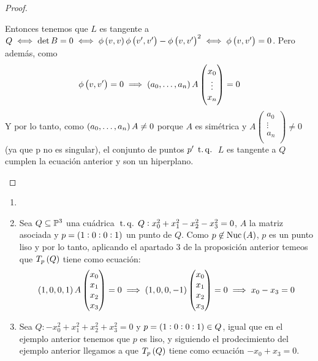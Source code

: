 \begin{proof}
\begin{enumerate}[(1)]
\[      \]
      Entonces tenemos que $L$ es tangente a $Q \iff \det B =0 \iff \phi\left( v,v\right)\phi\left( v',v'\right)
      - \phi\left( v,v'\right)^2 \iff \phi \left( v,v'\right) =0$. Pero además, como
      \[
        \phi\left( v,v'\right) =0\implies \left( a_0, \dots ,a_n \right) A 
        \begin{pmatrix}
          x_0\\ \vdots\\ x_n\\
        \end{pmatrix}=0
      \]
      Y por lo tanto, como $\left( a_0,\dots,a_n\right) A \neq 0$ porque $A$ es simétrica y $A\begin{pmatrix}
        a_0\\ \vdots\\ a_n\\ \end{pmatrix} \neq 0$ (ya que p no es singular), el conjunto de puntos $p' \operatorname{\;t.q.\;}$
      $L$ es tangente a $Q$ cumplen la ecuación anterior y son un hiperplano.
  \end{enumerate}
\end{proof}

\begin{example}
  \begin{enumerate}
    \item []
    \item Sea $Q\subseteq\mathbb{P}^3$ una cuádrica $\operatorname{\;t.q.\;} Q:x^2_0 +x^2_1 -x^2_2 -x^2_3=0$, $A$ la matriz asociada y $p=\left( 1:0:0:1\right)$
      un punto de $Q$. Como $p\not\in \operatorname{Nuc} \left( A\right)$, $p$ es un punto liso y por lo tanto, aplicando el 
      apartado $3$ de la proposición anterior temeos que $T_p\left( Q \right)$ tiene como ecuación:
      \[
        \left( 1,0,0,1 \right) A \begin{pmatrix}x_0\\x_1\\x_2\\x_3\\ \end{pmatrix} = 0 \implies 
        \left( 1,0,0,-1 \right) \begin{pmatrix}x_0\\x_1\\x_2\\x_3\\ \end{pmatrix} = 0 \implies
        x_0-x_3=0
      \]
    \item Sea $Q:-x^2_0 +x^2_1 +x^2_2 +x^2_3=0$ y $p=\left( 1:0:0:1\right) \in Q$, igual que en el
      ejemplo anterior tenemos que $p$ es liso, y siguiendo el prodecimiento del ejemplo anterior llegamos 
      a que $T_p\left( Q \right)$ tiene como ecuación $-x_0 +x_3=0$.
  \end{enumerate}
\end{example}

